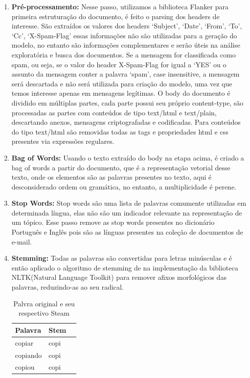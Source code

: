 \documentclass[12pt,a4paper]{article}
\begin{document}
\begin{enumerate}
\item \textbf{Pré-processamento:} Nesse passo, utilizamos a biblioteca Flanker para primeira estruturação do documento, é feito o parsing dos headers de interesse. São extraídos os valores dos headers ‘Subject’, ‘Date’, ‘From’, ‘To’, ‘Cc’, ‘X-Spam-Flag’ essas informações não são utilizadas para a geração do modelo, no entanto são informações complementares e serão úteis na análise exploratória e busca dos documentos. Se a mensagem for classificada como spam, ou seja, se o valor do header X-Spam-Flag for igual a ‘YES’ ou o assunto da mensagem conter a palavra ‘spam’, case insensitive, a mensagem será descartada e não será utilizada para criação do modelo, uma vez que temos interesse apenas em mensagens legítimas. O body do documento é dividido em múltiplas partes, cada parte possui seu próprio content-type, são processadas as partes com conteúdos de tipo text/html e text/plain, descartando anexos, mensagens criptografadas e codificadas. Para conteúdos do tipo text/html são removidas todas as tags e propriedades html e css presentes via expressões regulares.
\item \textbf{Bag of Words:} Usando o texto extraído do body na etapa acima, é criado a bag of words a partir do documento, que é a representação vetorial desse texto, onde os elementos são as palavras presentes no texto, aqui é desconsiderado ordem ou gramática, no entanto, a multiplicidade é perene.
\item \textbf{Stop Words:} Stop words são uma lista de palavras comumente utilizadas em determinada língua, elas não são um indicador relevante na representação de um tópico. Esse passo remove as stop words presentes no dicionário Português e Inglês pois são as línguas presentes na coleção de documentos de e-mail.
\item \textbf{Stemming:} Todas as palavras são convertidas para letras minúsculas e é então aplicado o algoritmo de stemming de  na implementação da biblioteca NLTK(Natural Language Toolkit)  para remover afixos morfológicos das palavras, reduzindo-as ao seu radical.


\begin{table}[h]
  \centering
  \begin{tabular}{l l l}
  Palavra		&Stem &\\
  \hline
  copiar		&copi &\\
  copiando		&copi &\\
  copiou		&copi &\\
  \hline
  \end{tabular}
  \caption{Palvra original e seu respectivo Steam}
\end{table}


\end{enumerate}
\end{document}
